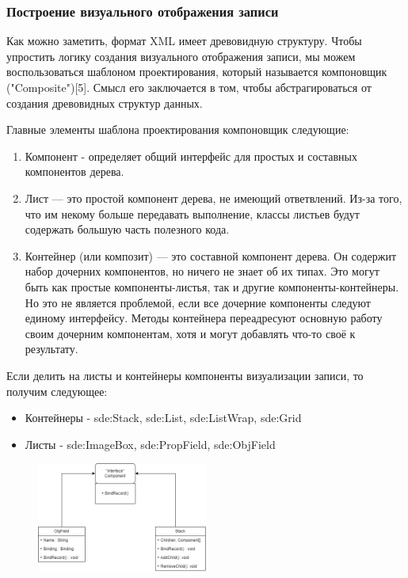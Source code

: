 \documentclass[12pt]{article}
\begin{document}
\subsubsection{Построение визуального отображения записи}
\qquad Как можно заметить, формат XML имеет древовидную структуру. Чтобы упростить логику создания визуального отображения записи, мы можем воспользоваться шаблоном проектирования, который называется компоновщик ("Composite")[5]. Смысл его заключается в том, чтобы абстрагироваться от создания древовидных структур данных.

Главные элементы шаблона проектирования компоновщик следующие:
\begin{enumerate}
    \item Компонент - определяет общий интерфейс для простых и составных компонентов дерева.
    \item Лист — это простой компонент дерева, не имеющий ответвлений. Из-за того, что им некому больше передавать выполнение, классы листьев будут содержать большую часть полезного кода.
    \item Контейнер (или композит) — это составной компонент дерева. Он содержит набор дочерних компонентов, но ничего не знает об их типах. Это могут быть как простые компоненты-листья, так и другие компоненты-контейнеры. Но это не является проблемой, если все дочерние компоненты следуют единому интерфейсу. Методы контейнера переадресуют основную работу своим дочерним компонентам, хотя и могут добавлять что-то своё к результату.
\end{enumerate}

Если делить на листы и контейнеры компоненты визуализации записи, то получим следующее:
\begin{itemize}
    \item Контейнеры - sde:Stack, sde:List, sde:ListWrap, sde:Grid
    \item Листы - sde:ImageBox, sde:PropField, sde:ObjField
\end{itemize}

\begin{figure}[!ht]
    \centering
    \includegraphics[width=0.5\textwidth]{_images/composer_arch.png}
\end{figure}
\end{document}
